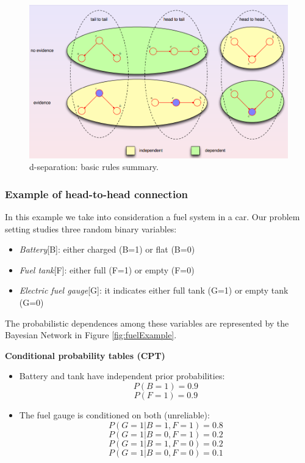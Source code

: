 \begin{figure}[H]
	\centering
	\includegraphics[width=\textwidth]{
		images/08_BayesianNetworks_dSeparationSummary.png
	}
	\caption{d-separation: basic rules summary.}
	\label{fig:basicRulesSummary}
\end{figure}

\subsubsection{Example of head-to-head connection}
In this example we take into consideration a fuel system in a car. Our problem
setting studies three random binary variables:
\begin{itemize}
	\item \textit{Battery}[B]: either charged (B=1) or flat (B=0)

	\item \textit{Fuel tank}[F]: either full (F=1) or empty (F=0)

	\item \textit{Electric fuel gauge}[G]: it indicates either full tank (G=1) or
		empty tank (G=0)
\end{itemize}
The probabilistic dependences among these variables are represented by the Bayesian
Network in Figure \ref{fig:fuelExample}.
\newline

\textbf{Conditional probability tables (CPT)}
\begin{itemize}
	\item Battery and tank have independent prior probabilities:
		\[
			P(B=1) = 0.9
		\]
		\[
			P(F=1) = 0.9
		\]

	\item The fuel gauge is conditioned on both (unreliable):
		\[
			P(G=1 | B=1, F=1) = 0.8
		\]
		\[
			P(G=1 | B=0, F=1) = 0.2
		\]
		\[
			P(G=1 | B=1, F=0) = 0.2
		\]
		\[
			P(G=1 | B=0, F=0) = 0.1
		\]
\end{itemize}

